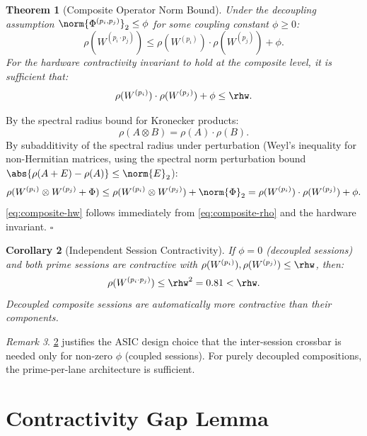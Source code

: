 \documentclass[12pt,letterpaper]{article}
\theoremstyle{plain}
\newtheorem{theorem}{Theorem}[section]
\newtheorem{corollary}[theorem]{Corollary}
\theoremstyle{definition}
\theoremstyle{remark}
\newtheorem{remark}[theorem]{Remark}
\begin{document}
\begin{theorem}[Composite Operator Norm Bound]
\label{thm:composite}
Under the decoupling assumption \(\norm{\Phi^{(p_i,p_j)}}_2 \leq \phi\) for
some coupling constant \(\phi \geq 0\):
\begin{equation}
  \rho(W^{(p_i \cdot p_j)})
  \leq \rho(W^{(p_i)}) \cdot \rho(W^{(p_j)}) + \phi.
  \label{eq:composite-rho}
\end{equation}
For the hardware contractivity invariant to hold at the composite level, it
is sufficient that:
\begin{equation}
  \rho(W^{(p_i)}) \cdot \rho(W^{(p_j)}) + \phi \leq \rhw.
  \label{eq:composite-hw}
\end{equation}
\end{theorem}

\begin{proofbox}
By the spectral radius bound for Kronecker products:
\[
  \rho(A \otimes B) = \rho(A) \cdot \rho(B).
\]
By subadditivity of the spectral radius under perturbation
(Weyl's inequality for non-Hermitian matrices, using the spectral norm
perturbation bound \(\abs{\rho(A + E) - \rho(A)} \leq \norm{E}_2\)):
\[
  \rho(W^{(p_i)} \otimes W^{(p_j)} + \Phi)
  \leq \rho(W^{(p_i)} \otimes W^{(p_j)}) + \norm{\Phi}_2
  = \rho(W^{(p_i)}) \cdot \rho(W^{(p_j)}) + \phi.
\]
\cref{eq:composite-hw} follows immediately from \cref{eq:composite-rho}
and the hardware invariant. \hfill\(\square\)
\end{proofbox}

\begin{corollary}[Independent Session Contractivity]
\label{cor:independent}
If \(\phi = 0\) (decoupled sessions) and both prime sessions are contractive
with \(\rho(W^{(p_i)}), \rho(W^{(p_j)}) \leq \rhw\), then:
\[
  \rho(W^{(p_i \cdot p_j)}) \leq \rhw^2 = 0.81 < \rhw.
\]
Decoupled composite sessions are automatically more contractive than their
components.
\end{corollary}

\begin{remark}
\cref{cor:independent} justifies the ASIC design choice that the inter-session
crossbar is needed only for non-zero \(\phi\) (coupled sessions). For purely
decoupled compositions, the prime-per-lane architecture is sufficient.
\end{remark}

\section{Contractivity Gap Lemma}
\label{sec:gap}
\end{document}
